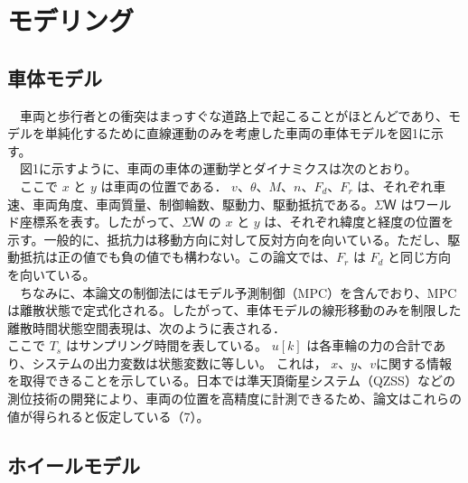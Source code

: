 \section{モデリング}
\subsection{車体モデル}
　車両と歩行者との衝突はまっすぐな道路上で起こることがほとんどであり、モデルを単純化するために直線運動のみを考慮した車両の車体モデルを図1に示す。\\
　図1に示すように、車両の車体の運動学とダイナミクスは次のとおり。\\


　ここで $x$ と $y$ は車両の位置である． $v$、$\theta$、$M$、$n$、$F_d$、$F_r$ は、それぞれ車速、車両角度、車両質量、制御輪数、駆動力、駆動抵抗である。$\Sigma Ｗ$ はワールド座標系を表す。したがって、$\Sigma Ｗ$ の $x$ と $y$ は、それぞれ緯度と経度の位置を示す。一般的に、抵抗力は移動方向に対して反対方向を向いている。ただし、駆動抵抗は正の値でも負の値でも構わない。この論文では、$F_r$ は $F_d$ と同じ方向を向いている。\\
　ちなみに、本論文の制御法にはモデル予測制御（MPC）を含んでおり、MPCは離散状態で定式化される。したがって、車体モデルの線形移動のみを制限した離散時間状態空間表現は、次のように表される．\\



ここで $T_s$ はサンプリング時間を表している。 $u[k]$ は各車輪の力の合計であり、システムの出力変数は状態変数に等しい。 これは， $x$、$y$、$v$に関する情報を取得できることを示している。日本では準天頂衛星システム（QZSS）などの測位技術の開発により、車両の位置を高精度に計測できるため、論文はこれらの値が得られると仮定している（7）。

\subsection{ホイールモデル}


